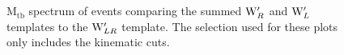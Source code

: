 \begin{figure}[htcb]
\begin{center}
\\
\\
\caption{
$\mathrm{M_{tb}}$ spectrum of events comparing the summed $\mathrm{W}^\prime_{R}$ and $\mathrm{W}^\prime_{L}$ templates to the $\mathrm{W}^\prime_{LR}$ template.  The selection used for these plots only includes the kinematic cuts.
}
\label{figs:Gencomp1}
\end{center}
\end{figure}


